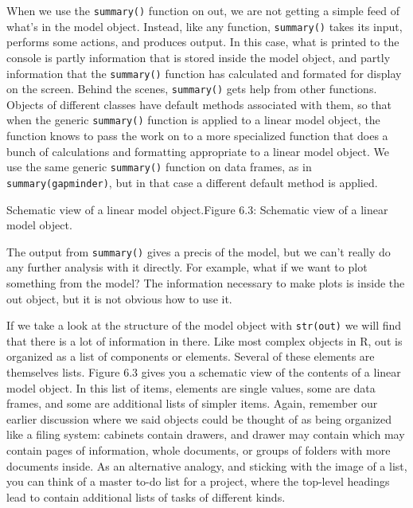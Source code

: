 \documentclass[]{book}
\begin{document}
When we use the \texttt{summary()} function on out, we are not getting a simple feed of what's in the model object. Instead, like any function, \texttt{summary()} takes its input, performs some actions, and produces output. In this case, what is printed to the console is partly information that is stored inside the model object, and partly information that the \texttt{summary()} function has calculated and formated for display on the screen. Behind the scenes, \texttt{summary()} gets help from other functions. Objects of different classes have default methods associated with them, so that when the generic \texttt{summary()} function is applied to a linear model object, the function knows to pass the work on to a more specialized function that does a bunch of calculations and formatting appropriate to a linear model object. We use the same generic \texttt{summary()} function on data frames, as in \texttt{summary(gapminder)}, but in that case a different default method is applied.

Schematic view of a linear model object.Figure 6.3: Schematic view of a linear model object.

The output from \texttt{summary()} gives a precis of the model, but we can't really do any further analysis with it directly. For example, what if we want to plot something from the model? The information necessary to make plots is inside the out object, but it is not obvious how to use it.

If we take a look at the structure of the model object with \texttt{str(out)} we will find that there is a lot of information in there. Like most complex objects in R, out is organized as a list of components or elements. Several of these elements are themselves lists. Figure 6.3 gives you a schematic view of the contents of a linear model object. In this list of items, elements are single values, some are data frames, and some are additional lists of simpler items. Again, remember our earlier discussion where we said objects could be thought of as being organized like a filing system: cabinets contain drawers, and drawer may contain which may contain pages of information, whole documents, or groups of folders with more documents inside. As an alternative analogy, and sticking with the image of a list, you can think of a master to-do list for a project, where the top-level headings lead to contain additional lists of tasks of different kinds.
\end{document}
